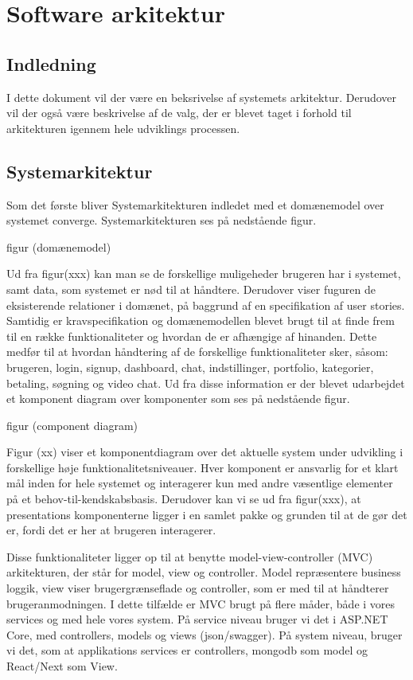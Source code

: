 \chapter{Software arkitektur}

\section{Indledning}

I dette dokument vil der være en beksrivelse af systemets arkitektur. 
Derudover vil der også være beskrivelse af de valg, der er blevet taget i forhold til arkitekturen igennem hele udviklings processen. 

\section{Systemarkitektur}
Som det første bliver Systemarkitekturen indledet med et domænemodel over systemet converge. Systemarkitekturen ses på nedstående figur.

figur (domænemodel)

Ud fra figur(xxx) kan man se de forskellige muligeheder brugeren har i systemet, samt data, som systemet er nød til at håndtere. Derudover viser fuguren  de eksisterende relationer i domænet, på baggrund af en specifikation af user stories. 
Samtidig er kravspecifikation og domænemodellen blevet brugt til at finde frem til en række funktionaliteter og hvordan de er afhængige af hinanden. Dette medfør til at hvordan håndtering af de forskellige funktionaliteter sker, såsom: brugeren, login, signup, dashboard, chat, indstillinger, portfolio, kategorier, betaling, søgning og video chat. Ud fra disse information er der blevet udarbejdet et komponent diagram over komponenter som ses på nedstående figur.

figur (component diagram)

Figur (xx) viser et komponentdiagram over det aktuelle system under udvikling i forskellige høje funktionalitetsniveauer. Hver komponent er ansvarlig for et klart mål inden for hele systemet og interagerer kun med andre væsentlige elementer på et behov-til-kendskabsbasis. Derudover kan vi se ud fra figur(xxx), at presentations komponenterne ligger i en samlet pakke og grunden til at de gør det er, fordi det er her at brugeren interagerer.

Disse funktionaliteter ligger op til at benytte model-view-controller (MVC) arkitekturen, der står for model, view og controller. Model repræsentere business loggik, view viser brugergrænseflade og controller, som er med til at håndterer brugeranmodningen. I dette tilfælde er MVC brugt på flere måder, både i vores services og med hele vores system. På service niveau bruger vi det i ASP.NET Core, med controllers, models og views (json/swagger). På system niveau, bruger vi det, som at applikations services er  controllers, mongodb som model og React/Next som View.

